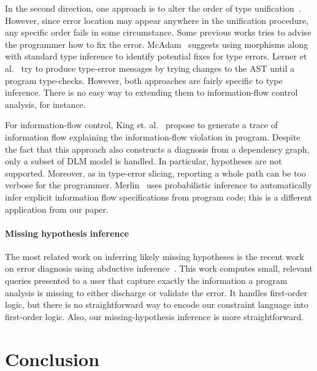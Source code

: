 In the second direction, one approach is to alter the order of type
unification~\cite{lee:toplas, mcadam:unification}. However, since
error location may appear anywhere in the unification procedure, any
specific order fails in some circumstance. Some previous works tries
to advise the programmer how to fix the error.
McAdam~\cite{mcadam:thesis} suggests using morphisms along with
standard type inference to identify potential fixes for type errors.
Lerner et al.~\cite{lerner:pldi07} try to produce type-error messages
by trying changes to the AST until a program type-checks.  However,
both approaches are fairly specific to type inference. There is no
easy way to extending them to information-flow control analysis, for
instance.

For information-flow control, King et. al.~\cite{king:fse} propose to
generate a trace of information flow explaining the information-flow
violation in program. Despite the fact that this approach also
constructs a diagnosis from a dependency graph, only a subset of DLM
model is handled. In particular, hypotheses are not supported.
Moreover, as in type-error slicing, reporting a whole path can be
too verbose for the programmer.  Merlin~\cite{livshits:merlin} uses
probabilistic inference to automatically infer explicit information
flow specifications from program code; this is a different
application from our paper.

\paragraph{Missing hypothesis inference}

The most related work on inferring likely missing hypotheses is the
recent work on error diagnosis using abductive
inference~\cite{dillig:pldi12}. This work computes small, relevant
queries presented to a user that capture exactly the information a
program analysis is missing to either discharge or validate the error.
It handles first-order logic, but there is no straightforward
way to encode our constraint language into first-order logic.
Also, our missing-hypothesis inference is more straightforward.


\section{Conclusion}

